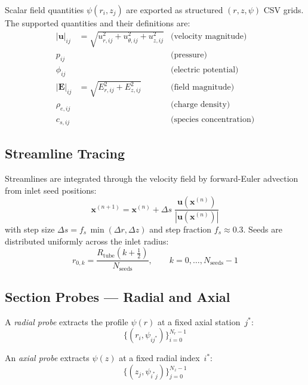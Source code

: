 \documentclass[11pt,a4paper]{article}
\begin{document}
Scalar field quantities $\psi(r_i, z_j)$ are exported as structured $(r, z,
\psi)$ CSV grids.  The supported quantities and their definitions are:
\begin{align}
  |\bm{u}|_{ij}  &= \sqrt{u_{r,ij}^2 + u_{\theta,ij}^2 + u_{z,ij}^2}
                    & \text{(velocity magnitude)} \\
  p_{ij}          && \text{(pressure)} \\
  \phi_{ij}       && \text{(electric potential)} \\
  |\bm{E}|_{ij}  &= \sqrt{E_{r,ij}^2 + E_{z,ij}^2}
                    & \text{(field magnitude)} \\
  \rho_{e,ij}     && \text{(charge density)} \\
  c_{s,ij}        && \text{(species concentration)}
\end{align}

\subsection{Streamline Tracing}

Streamlines are integrated through the velocity field by forward-Euler
advection from inlet seed positions:
\begin{equation}\label{eq:euler_step}
  \bm{x}^{(n+1)} = \bm{x}^{(n)} + \Delta s\;\frac{\bm{u}(\bm{x}^{(n)})}{|\bm{u}(\bm{x}^{(n)})|}
\end{equation}
with step size $\Delta s = f_s\,\min(\Delta r, \Delta z)$ and step fraction
$f_s \approx 0.3$.  Seeds are distributed uniformly across the inlet radius:
\begin{equation}\label{eq:seeds}
  r_{0,k} = \frac{R_{\mathrm{tube}}(k + \tfrac{1}{2})}{N_{\mathrm{seeds}}},
  \qquad k = 0,\ldots,N_{\mathrm{seeds}}-1
\end{equation}

\subsection{Section Probes — Radial and Axial}

A \emph{radial probe} extracts the profile $\psi(r)$ at a fixed axial
station~$j^*$:
\begin{equation}\label{eq:radial_probe}
  \{(r_i, \psi_{ij^*})\}_{i=0}^{N_r-1}
\end{equation}

An \emph{axial probe} extracts $\psi(z)$ at a fixed radial index~$i^*$:
\begin{equation}\label{eq:axial_probe}
  \{(z_j, \psi_{i^*j})\}_{j=0}^{N_z-1}
\end{equation}
\end{document}
